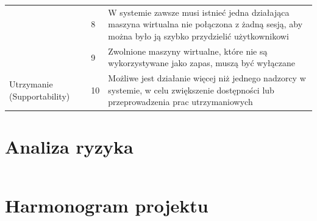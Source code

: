\documentclass[12pt]{article}
\begin{document}
\begin{center}
\begin{table}[h!]
\begin{tabular}{|p{}|p{}|p{}|}
			                                                & 8            & W systemie zawsze musi istnieć jedna działająca maszyna wirtualna nie połączona z żadną sesją, aby można było ją szybko przydzielić użytkownikowi                       \\ \cline{2-3}
			                                                & 9            & Zwolnione maszyny wirtualne, które nie są wykorzystywane jako zapas, muszą być wyłączane                                                                                \\ \hline
			\multirow[t]{3}{=}{Utrzymanie (Supportability)} & 10           & Możliwe jest działanie więcej niż jednego nadzorcy w systemie, w celu zwiększenie dostępności lub przeprowadzenia prac utrzymaniowych                                   \\
			\hline
		\end{tabular}
	\end{table}
\end{center}

\section{Analiza ryzyka}

\begin{tabular}{| c | c |}
\end{tabular}
\section{Harmonogram projektu}
\end{document}
